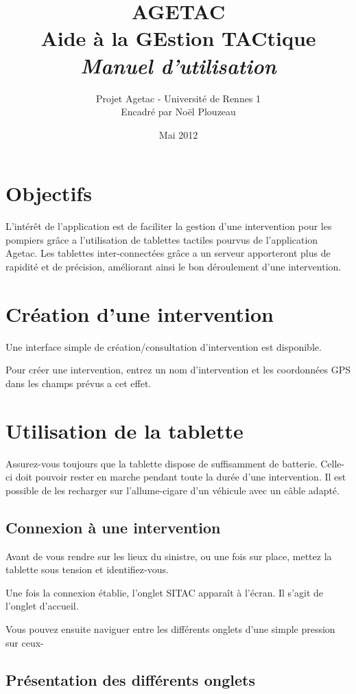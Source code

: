 \documentclass{article}
\title{\Huge{AGETAC\\
Aide à la GEstion TACtique\\}
\huge{{\color{color02} \textit{Manuel d'utilisation}}}}
\date{Mai 2012}
\author{Projet Agetac - Université de Rennes 1\\
Encadré par Noël Plouzeau}
\begin{document}
\maketitle
\vspace{1in}
\tableofcontents
\newpage
 \section{Objectifs}

L’intérêt de l’application est de faciliter la gestion d’une intervention pour les pompiers grâce a l’utilisation de tablettes tactiles pourvus de l’application Agetac. Les tablettes inter-connectées grâce a un serveur apporteront plus de rapidité et de précision, améliorant ainsi le bon déroulement d’une intervention.

\section{Création d’une intervention}

Une interface simple de création/consultation d’intervention est disponible.

Pour créer une intervention, entrez un nom d’intervention et les coordonnées GPS dans les champs prévus a cet effet.

\section{Utilisation de la tablette}

Assurez-vous toujours que la tablette dispose de suffisamment de batterie. Celle-ci doit pouvoir rester en marche pendant toute la durée d’une intervention. Il est possible de les recharger sur l’allume-cigare d’un véhicule avec un câble adapté.

\subsection{Connexion à une intervention}

Avant de vous rendre sur les lieux du sinistre, ou une fois sur place, mettez la tablette sous tension et identifiez-vous.

Une fois la connexion établie, l’onglet SITAC apparaît à l’écran. Il s’agit de l’onglet d’accueil.

Vous pouvez ensuite naviguer entre les différents onglets d’une simple pression sur ceux-

\subsection{Présentation des différents onglets}
\end{document}
